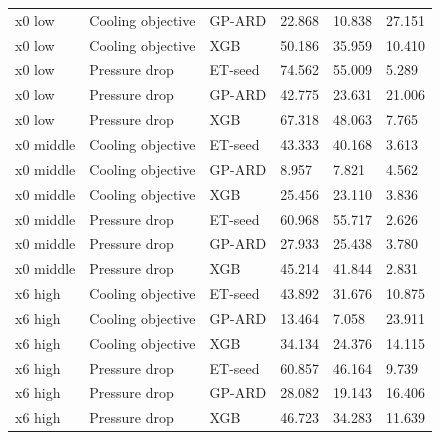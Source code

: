 \begin{longtable}{llllll}
x0 low & Cooling objective & GP-ARD & 22.868 & 10.838 & 27.151\\
x0 low & Cooling objective & XGB & 50.186 & 35.959 & 10.410\\
x0 low & Pressure drop & ET-seed & 74.562 & 55.009 & 5.289\\
x0 low & Pressure drop & GP-ARD & 42.775 & 23.631 & 21.006\\
x0 low & Pressure drop & XGB & 67.318 & 48.063 & 7.765\\
x0 middle & Cooling objective & ET-seed & 43.333 & 40.168 & 3.613\\
x0 middle & Cooling objective & GP-ARD & 8.957 & 7.821 & 4.562\\
x0 middle & Cooling objective & XGB & 25.456 & 23.110 & 3.836\\
x0 middle & Pressure drop & ET-seed & 60.968 & 55.717 & 2.626\\
x0 middle & Pressure drop & GP-ARD & 27.933 & 25.438 & 3.780\\
x0 middle & Pressure drop & XGB & 45.214 & 41.844 & 2.831\\
x6 high & Cooling objective & ET-seed & 43.892 & 31.676 & 10.875\\
x6 high & Cooling objective & GP-ARD & 13.464 & 7.058 & 23.911\\
x6 high & Cooling objective & XGB & 34.134 & 24.376 & 14.115\\
x6 high & Pressure drop & ET-seed & 60.857 & 46.164 & 9.739\\
x6 high & Pressure drop & GP-ARD & 28.082 & 19.143 & 16.406\\
x6 high & Pressure drop & XGB & 46.723 & 34.283 & 11.639\\
\bottomrule\end{longtable}\endgroup
